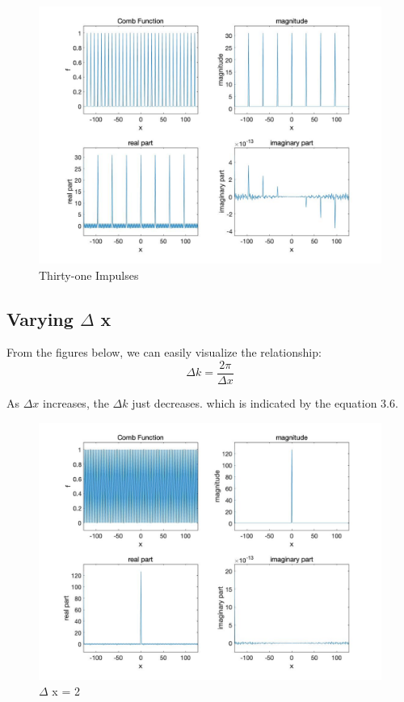 \documentclass[11pt,a4paper,BCOR12mm, headexclude, footexclude, twoside, openright]{scrartcl}
\numberwithin{equation}{section} %
\numberwithin{figure}{section} %
\numberwithin{table}{section} %
\begin{document}
\begin{figure}[h!]
\centering
\includegraphics[scale=0.35]{16.jpg}
\caption{Thirty-one Impulses}
\end{figure}

\newpage

\newpage

\subsection{Varying $\Delta$ x}

From the figures below, we can easily visualize the relationship:
\begin{equation}
    \Delta k = \frac{2 \pi}{ \Delta x}
\end{equation}

As $\Delta x$ increases, the $\Delta k$ just decreases. which is indicated by the equation 3.6.

\begin{figure}[h!]
\centering
\includegraphics[scale=0.35]{d2.jpg}
\caption{$\Delta$ x = 2}
\end{figure}
\end{document}
